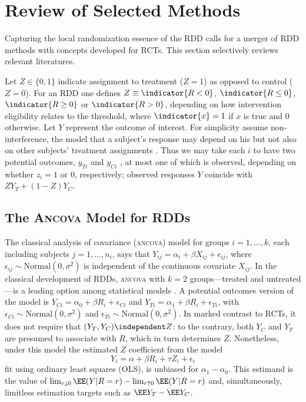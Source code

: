 \section{Review of Selected Methods}\label{sec:review}


Capturing the local randomization essence of the RDD calls for
a merger of RDD methods with concepts developed for RCTs. This
section selectively reviews relevant literatures.

Let $Z \in \{0,1\}$ indicate assignment to treatment ($Z=1$) as opposed to control
($Z=0$).  For an RDD one defines $Z \equiv \indicator{R< 0}$,
$\indicator{R \leq 0}$, $\indicator{R\geq 0}$ or $\indicator{R > 0}$,
depending on how intervention eligibility relates to the threshold,
where $\indicator{x}=1$ if $x$ is true and $0$ otherwise.
Let $Y$ represent the outcome of interest.
For simplicity assume non-interference, the model that
a subject's response may depend on his but not also on other subjects'
treatment assignments \citep{cox:1958,rubin:1978}.  Thus we may take each $i$
to have two potential outcomes, $y_{Ti}$ and $y_{Ci}$ , at most one of which is observed, depending on whether $z_i=1$ or $0$, respectively;
 observed
responses $Y$ coincide with $ZY_{T}+(1-Z)Y_{C}$.

\subsection{The \textsc{Ancova} Model for RDDs}\label{sec:robust-analys-covar}

The classical analysis of covariance (\textsc{ancova}) model for
groups $i=1,\ldots, k$, each including subjects $j=1, \ldots, n_{i}$,
says that
$Y_{ij} = \alpha_{i} + \beta X_{ij} + \epsilon_{ij}$, where $\epsilon_{ij}
\sim \mathrm{Normal}(0, \sigma^{2})$ is independent of the continuous
covariate $X_{ij}$.
In the classical development of RDDs, \textsc{ancova} with $k=2$
groups---treated and untreated---is a leading option among statistical
models
\citep{thistlethwaite1960regression}.
A potential outcomes version of the model is
 $Y_{Ci} = \alpha_{0} + \beta R_{i} + \epsilon_{Ci}$ and
$Y_{Ti} = \alpha_{1}  + \beta R_{i} + \epsilon_{Ti}$, with
 $\epsilon_{Ci} \sim \mathrm{Normal}(0, \sigma^{2})$ and
 $\epsilon_{Ti} \sim \mathrm{Normal}(0, \sigma^{2})$.
In marked contrast to RCTs, it does
not require that $(Y_{T}, Y_{C}) \independent Z$: to the contrary, both
$Y_{C}$ and $Y_{T}$ are presumed to associate with $R$, which in turn
determines $Z$.
Nonetheless, under this model the estimated $Z$ coefficient from the
model
\begin{equation}\label{eq:classicOLS}
Y_i=\alpha+\beta R_i+\tau Z_i+\epsilon_i
\end{equation}
fit using ordinary least squares (OLS), is unbiased for
$\alpha_{1} - \alpha_{0}$.
This estimand is the value of  $\lim_{r\downarrow 0} \EE(Y | R=r) -
\lim_{r\uparrow 0} \EE(Y | R=r)$ and, simultaneously,
limitless estimation targets such as $\EE Y_{T}  - \EE Y_{C}$.

